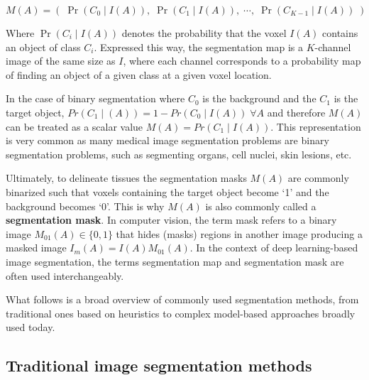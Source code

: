 \begin{equation}
M(A) = (\;\operatorname{Pr}(C_0\!\mid\!I(A)),\; \operatorname{Pr}(C_1\!\mid\!I(A)),\; \cdots\!,\;  \operatorname{Pr}(C_{K - 1}\!\mid\!I(A))\;)
\end{equation}

Where $\operatorname{Pr} (C_i \!\mid\! I(A))$ denotes the probability that the voxel $I(A)$ contains an object of class $C_i$. Expressed this way, the segmentation map is a $K$-channel image of the same size as $I$, where each channel corresponds to a probability map of finding an object of a given class at a given voxel location. 

In the case of binary segmentation where $C_0$ is the background and the $C_1$ is the target object, $Pr(C_1 \!\mid\! (A)) = 1 - Pr(C_0 \!\mid\! I(A))\; \forall A$ and therefore $M(A)$ can be treated as a scalar value $M(A) = Pr(C_1 \!\mid\! I(A))$. This representation is very common as many medical image segmentation problems are binary segmentation problems, such as segmenting organs, cell nuclei, skin lesions, etc.

Ultimately, to delineate tissues the segmentation masks $M(A)$ are commonly binarized such that voxels containing the target object become `1' and the background becomes `0'. This is why $M(A)$ is also commonly called a \textbf{segmentation mask}. In computer vision, the term mask refers to a binary image $M_{01}(A) \in \{0, 1\}$ that hides (masks) regions in another image producing a masked image $I_m(A) = I(A) M_{01}(A)$. In the context of deep learning-based image segmentation, the terms segmentation map and segmentation mask are often used interchangeably.

What follows is a broad overview of commonly used segmentation methods, from traditional ones based on heuristics to complex model-based approaches broadly used today.

\subsection{Traditional image segmentation methods}







